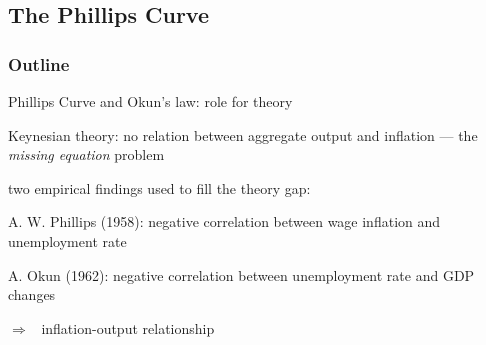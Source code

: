 \documentclass{beamer}
\newenvironment{mytemize}
{\vfill\itemize[nolistsep,itemsep=\fill,label=\color{blue}{$\triangleright$}]}
  {\enditemize}
\newenvironment{mynumerate}
{\vfill\enumerate[nolistsep,itemsep=\fill,label=\arabic*.]}
  {\endenumerate}
\newcommand{\rarr}{$\Rightarrow$\ }
\begin{document}
\subsection{The Phillips Curve}
\begin{frame}
\frametitle{Outline}
\tableofcontents[currentsubsection]
\end{frame}
\begin{frame}{Phillips Curve and Okun's law: role for theory}
\begin{mytemize}
\item Keynesian theory: no relation between aggregate output and inflation --- the \emph{missing equation} problem
\item two empirical findings used to fill the theory gap:
  \begin{mynumerate}
	\item A. W. Phillips (1958): negative correlation between wage inflation and unemployment rate
	\item A. Okun (1962): negative correlation between unemployment rate and GDP changes
  \end{mynumerate}
\item[\rarr] inflation-output relationship
\end{mytemize}
\end{frame}
\end{document}
